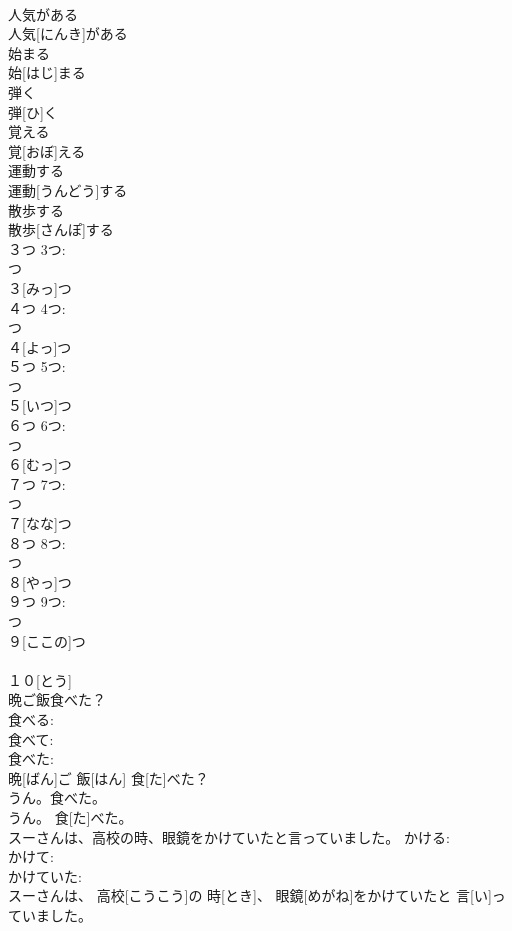\documentclass[8pt]{extreport}
\begin{document}
\begin{CJK}{UTF8}{min}
\\	人気がある	
\\	人気[にんき]がある		
\\	始まる	
\\	始[はじ]まる		
\\	弾く	
\\	弾[ひ]く		
\\	覚える	
\\	覚[おぼ]える		
\\	運動する	
\\	運動[うんどう]する		
\\	散歩する	
\\	散歩[さんぽ]する		
\\	３つ	3つ: 
\\	つ 
\\	３[みっ]つ		
\\	４つ	4つ: 
\\	つ 
\\	４[よっ]つ		
\\	５つ	5つ: 
\\	つ 
\\	５[いつ]つ		
\\	６つ	6つ: 
\\	つ 
\\	６[むっ]つ		
\\	７つ	7つ: 
\\	つ 
\\	７[なな]つ		
\\	８つ	8つ: 
\\	つ 
\\	８[やっ]つ		
\\	９つ	9つ: 
\\	つ 
\\	９[ここの]つ		
\\	[とう] 
\\	１０[とう]		
\\	晩ご飯食べた？	
\\	食べる: 
\\	食べて: 
\\	食べた: 
\\	晩[ばん]ご 飯[はん] 食[た]べた？		
\\	うん。食べた。	
\\	うん。 食[た]べた。		
\\	スーさんは、高校の時、眼鏡をかけていたと言っていました。	かける: 
\\	かけて: 
\\	かけていた: 
\\	スーさんは、 高校[こうこう]の 時[とき]、 眼鏡[めがね]をかけていたと 言[い]っていました。	

\end{CJK}
\end{document}
